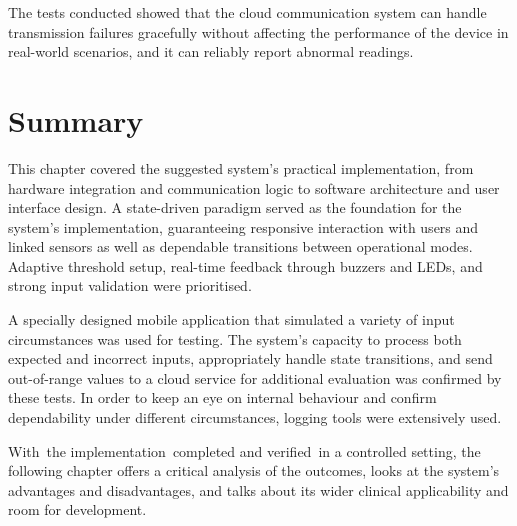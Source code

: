 The tests conducted showed that the cloud communication system can handle transmission failures gracefully without affecting the performance of the device in real-world scenarios, and it can reliably report abnormal readings.

\section{Summary}
This chapter covered the suggested system's practical implementation, from hardware integration and communication logic to software architecture and user interface design. A state-driven paradigm served as the foundation for the system's implementation, guaranteeing responsive interaction with users and linked sensors as well as dependable transitions between operational modes. Adaptive threshold setup, real-time feedback through buzzers and LEDs, and strong input validation were prioritised.

A specially designed mobile application that simulated a variety of input circumstances was used for testing. The system's capacity to process both expected and incorrect inputs, appropriately handle state transitions, and send out-of-range values to a cloud service for additional evaluation was confirmed by these tests. In order to keep an eye on internal behaviour and confirm dependability under different circumstances, logging tools were extensively used.

With the implementation completed and verified in a controlled setting, the following chapter offers a critical analysis of the outcomes, looks at the system's advantages and disadvantages, and talks about its wider clinical applicability and room for development.
